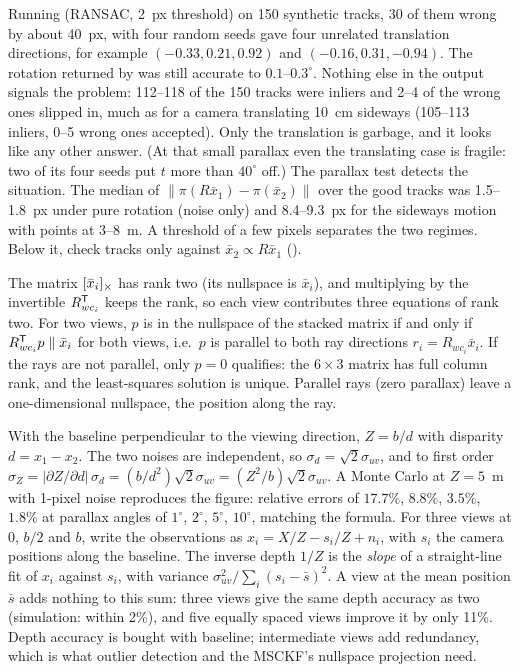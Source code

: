 \begin{solutions}
        Running  (RANSAC, 2~px threshold) on 150 synthetic tracks, 30 of them wrong by about 40~px, with four random seeds gave four unrelated
        translation directions, for example $(-0.33, 0.21, 0.92)$ and $(-0.16, 0.31, -0.94)$. The rotation returned by  was still accurate to
        $0.1$--$0.3^\circ$. Nothing else in the output signals the problem: 112--118 of the 150 tracks were inliers and 2--4 of the wrong ones slipped in, much as for a
        camera translating 10~cm sideways (105--113 inliers, 0--5 wrong ones accepted). Only the translation is garbage, and it looks like any other answer.
        (At that small parallax even the translating case is fragile: two of its four seeds put $t$ more than $40^\circ$ off.) The parallax test detects the situation.
        The median of $\|\pi(R\bar x_1) - \pi(\bar x_2)\|$ over the good tracks was 1.5--1.8~px under pure rotation (noise only) and 8.4--9.3~px for the sideways motion with points at
        3--8~m. A threshold of a few pixels separates the two regimes. Below it, check tracks only against $\bar x_2 \propto R\bar x_1$
        ().

  \item The matrix $[\bar x_i]_{\times}$ has rank two (its nullspace is $\bar x_i$), and multiplying by the invertible $R_{wc_i}^{\mathsf{T}}$ keeps the rank, so each view contributes three
        equations of rank two. For two views, $p$ is in the nullspace of the stacked matrix if and only if $R_{wc_i}^{\mathsf{T}} p \parallel \bar x_i$ for both views, i.e.\ $p$ is parallel to both ray
        directions $r_i = R_{wc_i}\bar x_i$. If the rays are not parallel, only $p = 0$ qualifies: the $6\times3$ matrix has full column rank, and the least-squares solution
        is unique. Parallel rays (zero parallax) leave a one-dimensional nullspace, the position along the ray.

  \item With the baseline perpendicular to the viewing direction, $Z = b/d$ with disparity $d = x_1 - x_2$. The two noises are independent, so $\sigma_d = \sqrt2\sigma_{uv}$, and to first
        order $\sigma_Z = |\partial Z/\partial d|\,\sigma_d = (b/d^2)\sqrt2\sigma_{uv} = (Z^2/b)\sqrt2\sigma_{uv}$. A Monte Carlo at $Z = 5$~m with 1-pixel noise reproduces the figure: relative errors
        of $17.7\%$, $8.8\%$, $3.5\%$, $1.8\%$ at parallax angles of $1^\circ$, $2^\circ$, $5^\circ$, $10^\circ$, matching the formula. For three views at $0$, $b/2$ and $b$, write the
        observations as $x_i = X/Z - s_i/Z + n_i$, with $s_i$ the camera positions along the baseline. The inverse depth $1/Z$ is the \emph{slope} of a straight-line fit of $x_i$
        against $s_i$, with variance $\sigma_{uv}^2/\sum_i(s_i - \bar s)^2$. A view at the mean position $\bar s$ adds nothing to this sum: three views give the same depth accuracy as
        two (simulation: within 2\%), and five equally spaced views improve it by only 11\%. Depth accuracy is bought with baseline; intermediate views
        add redundancy, which is what outlier detection and the MSCKF's nullspace projection need.


\end{solutions}
